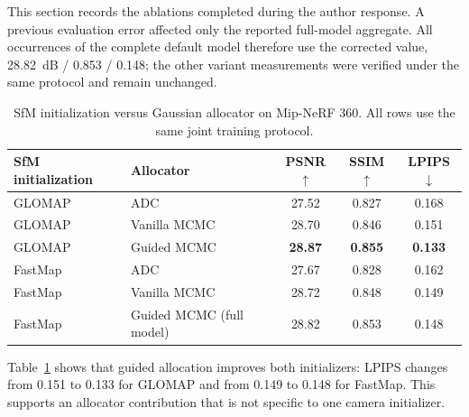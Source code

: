 \documentclass[sigconf]{acmart}
\begin{document}
This section records the ablations completed during the author response. A previous evaluation error affected only the reported full-model aggregate. All occurrences of the complete default model therefore use the corrected value, 28.82~dB / 0.853 / 0.148; the other variant measurements were verified under the same protocol and remain unchanged.

\begin{table}[t]
    \centering
    \caption{SfM initialization versus Gaussian allocator on Mip-NeRF 360. All rows use the same joint training protocol.}
    \label{tab:supp_init_allocator}
    \begin{tabular}{l lccc}
        \toprule
        SfM initialization & Allocator & PSNR$\uparrow$ & SSIM$\uparrow$ & LPIPS$\downarrow$ \\
        \midrule
        GLOMAP & ADC & 27.52 & 0.827 & 0.168 \\
        GLOMAP & Vanilla MCMC & 28.70 & 0.846 & 0.151 \\
        GLOMAP & Guided MCMC & \textbf{28.87} & \textbf{0.855} & \textbf{0.133} \\
        FastMap & ADC & 27.67 & 0.828 & 0.162 \\
        FastMap & Vanilla MCMC & 28.72 & 0.848 & 0.149 \\
        FastMap & Guided MCMC (full model) & 28.82 & 0.853 & 0.148 \\
        \bottomrule
    \end{tabular}
\end{table}

Table~\ref{tab:supp_init_allocator} shows that guided allocation improves both initializers: LPIPS changes from 0.151 to 0.133 for GLOMAP and from 0.149 to 0.148 for FastMap. This supports an allocator contribution that is not specific to one camera initializer.
\end{document}
